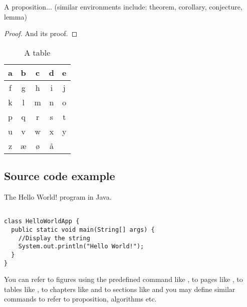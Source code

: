 \begin{proposition}\label{def:a_proposition}
A proposition... (similar environments include: theorem, corollary, conjecture, lemma)

\end{proposition}

\begin{proof}
\vspace*{-1em} %
And its proof.
\end{proof}

\begin{table}
\caption{\label{tab:example}A table}
\centering
\begin{tabular}[b]{| c | c | c | c | c |}
\hline
a & b & c & d & e \\ \hline
f & g & h & i & j \\ \hline
k & l & m & n & o \\ \hline
p & q & r & s & t \\ \hline
u & v & w & x & y \\ \hline
z & æ & ø & å &   \\ \hline
\end{tabular} 
\end{table}

\subsection{Source code example}

\begin{algorithm}[h]
  \caption{The Hello World! program in Java.}
  \label{hello_world}
  \begin{verbatim}
  
class HelloWorldApp {
  public static void main(String[] args) {
    //Display the string
    System.out.println("Hello World!");
  }
}
\end{verbatim}
\end{algorithm}

You can refer to figures using the predefined command like , to pages like , to tables like , to chapters like  and to sections like  and you may define similar commands to refer to proposition, algorithms etc.
